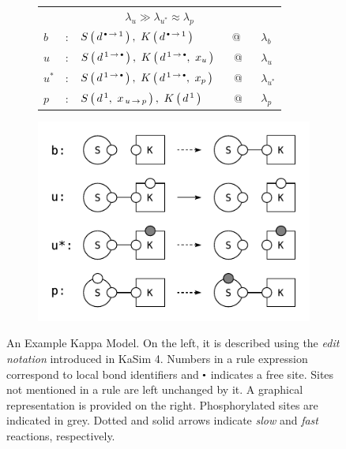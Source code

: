 \begin{figure}
  \vspace{-0.2cm}
  \begin{subfigure}[h]{0.45\linewidth}
    \def\arraystretch{1.8}
    \begin{small}
      \begin{tabular}{lllcl}
        \multicolumn{5}{c}{$\lambda_u \gg \lambda_{u^*} \approx \lambda_p$} \\
        $b$ \hspace{0.05cm} & : \hspace{0.1cm} & $ \AG{S}{d^{\Trans{\Free}{1}}}, \ 
        \AG{K}{d^{\Trans{\Free}{1}}} $ &  \ @ \  & $\lambda_b$ \\
        $u$ & : & $ \AG{S}{d^{\Trans{1}{\Free}}}, \ 
                  \AG{K}{d^{\Trans{1}{\Free}}, \ x_u} $ & @ & $\lambda_u$ \\
        $u^*$ & : & $ \AG{S}{d^{\Trans{1}{\Free}}}, \ 
                    \AG{K}{d^{\Trans{1}{\Free}}, \ x_p} $ & @ & $\lambda_{u^*}$ \\
        $p$ & : & $ \AG{S}{d^{\,1}, \  x_{\Trans{u}{p}}}, \ 
                  \AG{K}{d^{\,1}} $ & @ & $\lambda_p$ \\
      \end{tabular}
    \end{small}
  \end{subfigure}
  \hfill
  \begin{subfigure}[h]{0.43\linewidth}
    \begin{center}
      \includegraphics[scale=0.8]{kappa-diagrams/model.pdf}
    \end{center}
  \end{subfigure}
  \caption{An Example Kappa Model. On the left, it is described using
    the \textit{edit notation} introduced in KaSim 4. Numbers in a
    rule expression correspond to local bond identifiers and $\Free$
    indicates a free site. Sites not mentioned in a rule are left
    unchanged by it. A graphical representation is provided on the
    right. Phosphorylated sites are indicated in grey. Dotted and
    solid arrows indicate \textit{slow} and \textit{fast} reactions,
    respectively.  }\label{fig:model}
\end{figure}